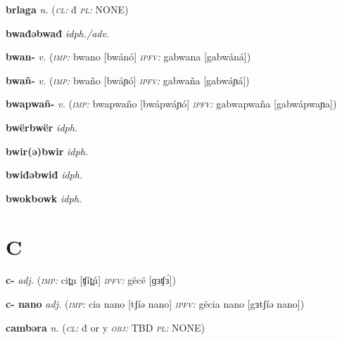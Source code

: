 \newentry
\headword\textbf{brlaga} 
\ipa{[brlágá]} 
\synpos\textit{n.} 
\class(\textit{\textsc{cl:}} {đ}
\plural\textit{\textsc{pl:}} NONE) 

\newentry
\headword\textbf{bwađəbwađ} 
\synpos\textit{idph./adv.} 

\newentry
\headword\textbf{bwan-}
\ipa{[bwán-]}
\synpos\textit{v.} 
\imperative(\textit {\textsc{imp:}} bwano [bwánó] 
\imperfective\textit{\textsc{ipfv:}} gabwana [gabwáná])


\newentry
\headword\textbf{bwañ-}
\ipa{[bwáɲ-]}
\synpos\textit{v.} 
\imperative(\textit {\textsc{imp:}} bwaño [bwáɲó] 
\imperfective\textit{\textsc{ipfv:}} gabwaña [gabwáɲá])

\newentry
\headword\textbf{bwapwañ-}
\ipa{[bwapwaɲ-]}
\synpos\textit{v.} 
\imperative(\textit {\textsc{imp:}} bwapwaño [bwápwáɲó] 
\imperfective\textit{\textsc{ipfv:}} gabwapwaña [gabwápwaɲa])

\newentry
\headword\textbf{bwërbwër} 
\synpos\textit{idph.} 

\newentry
\headword\textbf{bwir(ə)bwir} 
\synpos\textit{idph.} 

\newentry
\headword\textbf{bwiđəbwiđ} 
\synpos\textit{idph.} 

\newentry
\headword\textbf{bwokbowk} 
\ipa{[ɸwokɸwok]} 
\synpos\textit{idph.} 

\section*{C}\label{C}

\newentry
\headword\textbf{c-}
\ipa{[tʃ-]}
\synpos\textit{adj.} 
\imperative(\textit {\textsc{imp:}} cit̪u [ʧít̪ú] 
\imperfective\textit{\textsc{ipfv:}} gëcë [ɡɜʧɜ́])

\newentry
\headword\textbf{c- nano}
\ipa{[tʃ- nano]}
\synpos\textit{adj.} 
\imperative(\textit {\textsc{imp:}} cia nano [tʃíə nano] 
\imperfective\textit{\textsc{ipfv:}} gëcia nano [gɜtʃíə nano])

\newentry
\headword\textbf{cambəra} 
\ipa{[tʃambə́ɾa]} 
\synpos\textit{n.} 
\class(\textit{\textsc{cl:}} {đ or y}
\object\textit{\textsc{obj:}} TBD
\plural\textit{\textsc{pl:}} NONE) 

